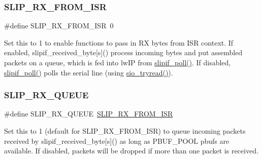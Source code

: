 \subsubsection{\texorpdfstring{S\+L\+I\+P\+\_\+\+R\+X\+\_\+\+F\+R\+O\+M\+\_\+\+I\+SR}{SLIP\_RX\_FROM\_ISR}}
{\footnotesize\ttfamily \#define S\+L\+I\+P\+\_\+\+R\+X\+\_\+\+F\+R\+O\+M\+\_\+\+I\+SR~0}

Set this to 1 to enable functions to pass in RX bytes from I\+SR context. If enabled, slipif\+\_\+received\+\_\+byte\mbox{[}s\mbox{]}() process incoming bytes and put assembled packets on a queue, which is fed into lw\+IP from \hyperlink{native_2lwip_2src_2include_2netif_2slipif_8h_a7b036fd1cde9b299139cac62f52d15a6}{slipif\+\_\+poll()}. If disabled, \hyperlink{native_2lwip_2src_2include_2netif_2slipif_8h_a7b036fd1cde9b299139cac62f52d15a6}{slipif\+\_\+poll()} polls the serial line (using \hyperlink{native_2lwip_2src_2include_2lwip_2sio_8h_a3780ab1928702f82974ee66988220040}{sio\+\_\+tryread()}). \mbox{\label{openmote-cc2538_2lwip_2src_2include_2netif_2slipif_8h_a37ce8613535232db02bfd9ae9b51c668}} 
\subsubsection{\texorpdfstring{S\+L\+I\+P\+\_\+\+R\+X\+\_\+\+Q\+U\+E\+UE}{SLIP\_RX\_QUEUE}}
{\footnotesize\ttfamily \#define S\+L\+I\+P\+\_\+\+R\+X\+\_\+\+Q\+U\+E\+UE~\hyperlink{openmote-cc2538_2lwip_2src_2include_2netif_2slipif_8h_a832eb1b9634b21aa0b91f78abfd852ea}{S\+L\+I\+P\+\_\+\+R\+X\+\_\+\+F\+R\+O\+M\+\_\+\+I\+SR}}

Set this to 1 (default for S\+L\+I\+P\+\_\+\+R\+X\+\_\+\+F\+R\+O\+M\+\_\+\+I\+SR) to queue incoming packets received by slipif\+\_\+received\+\_\+byte\mbox{[}s\mbox{]}() as long as P\+B\+U\+F\+\_\+\+P\+O\+OL pbufs are available. If disabled, packets will be dropped if more than one packet is received. \mbox{\label{openmote-cc2538_2lwip_2src_2include_2netif_2slipif_8h_a198967c11f79cffc32192710294e8826}} 
